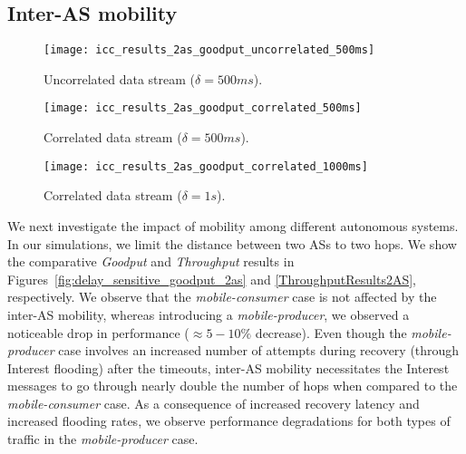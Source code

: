 \documentclass[conference]{IEEEtran}
\begin{document}
\subsection{Inter-AS mobility}
\begin{figure*}
        \centering
        \hspace{-0.15in}
        \begin{subfigure}[b]{0.3\textwidth}\centering
               \texttt{[image: icc\_results\_2as\_goodput\_uncorrelated\_500ms]}\\
               \caption{Uncorrelated data stream ($\delta = 500ms$).}
               \label{2ASUncorrelatedGoodput}
        \end{subfigure}
        \hspace{0.05in}
        \begin{subfigure}[b]{0.3\textwidth}\centering
                \texttt{[image: icc\_results\_2as\_goodput\_correlated\_500ms]}\\
                \caption{Correlated data stream ($\delta = 500ms$).}
                \label{2ASCorrelatedGoodput250ms}
        \end{subfigure}
        \hspace{0.05in}
        \begin{subfigure}[b]{0.3\textwidth}\centering
                \texttt{[image: icc\_results\_2as\_goodput\_correlated\_1000ms]}\\
                \caption{Correlated data stream ($\delta = 1s$).}
                \label{2ASCorrelatedGoodput1000ms}
        \end{subfigure}
        \caption{User perceived Goodput performance for the delay-sensitive traffic with inter-AS mobility.}\label{fig:delay_sensitive_goodput_2as}
\end{figure*}

We next investigate the impact of mobility among different autonomous systems. In our simulations, we limit the distance between two ASs to two hops. We show the comparative \emph{Goodput} and \emph{Throughput} results in Figures~\ref{fig:delay_sensitive_goodput_2as} and \ref{ThroughputResults2AS}, respectively. We observe that the \emph{mobile-consumer} case is not affected by the inter-AS mobility, whereas introducing a \emph{mobile-producer}, we observed a noticeable drop in performance ($\approx 5-10\%$ decrease). Even though the \emph{mobile-producer} case involves an increased number of attempts during recovery (through Interest flooding) after the timeouts, inter-AS mobility necessitates the Interest messages to go through nearly double the number of hops when compared to the \emph{mobile-consumer} case. As a consequence of increased recovery latency and increased flooding rates, we observe performance degradations for both types of traffic in the \emph{mobile-producer} case.
\end{document}
